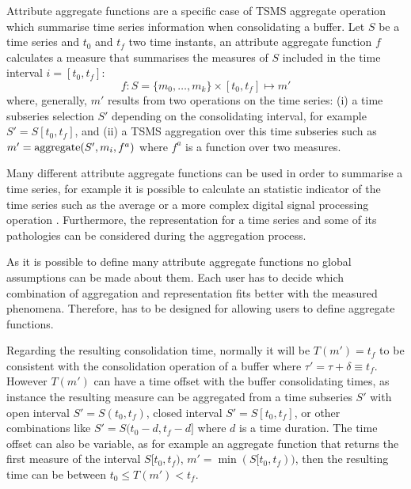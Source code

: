Attribute aggregate functions are a specific case of TSMS aggregate
operation which summarise time series information when consolidating a
buffer. Let $S$ be a time series and $t_0$ and $t_f$ two time
instants, an attribute aggregate function $f$ calculates a measure
that summarises the measures of $S$ included in the time interval
$i=[t_0,t_f]$:
\[
f : S=\{m_0,\ldots,m_k\} \times [t_0,t_f] \mapsto m'
\]
where, generally, $m'$ results from two operations on the time series:
(i) a time subseries selection $S'$ depending on the consolidating
interval, for example $S' = S[t_0,t_f]$, and (ii) a TSMS aggregation
over this time subseries such as $m' = \operatorname*{aggregate}(S',m_i, f^a)$ where $f^a$
is a function over two measures.


Many different attribute aggregate functions can be used in order to
summarise a time series, for example it is possible to calculate an
statistic indicator of the time series such as the average or a more
complex digital signal processing operation
\cite{zhang11}. Furthermore, the representation for a time series and
some of its pathologies can be considered during the aggregation
process.


As it is possible to define many attribute aggregate
functions no global assumptions can be made about them. Each user has
to decide which combination of aggregation and representation fits
better with the measured phenomena.  Therefore,  has to be
designed for allowing users to define aggregate functions.





Regarding the resulting consolidation time, normally it will be
$T(m')=t_f$ to be consistent with the consolidation operation of a
buffer where $\tau' = \tau + \delta \equiv t_f$. However $T(m')$ can
have a time offset with the buffer consolidating times, as instance
the resulting measure can be aggregated from a time subseries $S'$
with open interval $S'=S(t_0,t_f)$, closed interval $S'=S[t_0,t_f]$,
or other combinations like $S'=S(t_0-d,t_f-d]$ where $d$ is a time
duration.  The time offset can also be variable, as for example an
aggregate function that returns the first measure of the interval
$S[t_0,t_f)$, $m'=\min(S[t_0,t_f))$, then the resulting time can be
between $t_0 \leq T(m') < t_f$.

